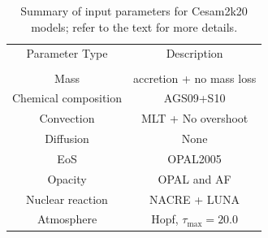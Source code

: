 \documentclass[12pt,a4paper]{article}
\begin{document}
\begin{table}
    \hfill
    \begin{tabularx}{.8\textwidth}{|| c | c ||}
      \cline{1-2}
      Parameter Type & Description \\ \cline{1-2}\\[-1em]\cline{1-2}
      Mass & accretion + no mass loss\\ \cline{1-2}
      Chemical composition  & AGS09+S10\\ \cline{1-2}
      Convection & MLT + No overshoot\\ \cline{1-2}
      Diffusion & None\\ \cline{1-2}
      EoS & OPAL2005\\ \cline{1-2}
      Opacity & OPAL and AF\\ \cline{1-2}
      Nuclear reaction & NACRE + LUNA\\ \cline{1-2}
      Atmosphere & Hopf, $\tau_{\max} = 20.0$\\ \cline{1-2}
    \end{tabularx}
    \caption{Summary of input parameters for Cesam2k20 models; refer to the text for more details.} \label{tab:input_physics}
    \hfill
\end{table}
\end{document}
